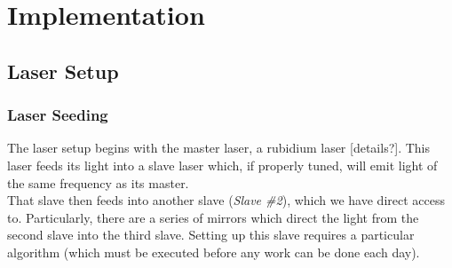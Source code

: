 \newpage
\section{Implementation}

\subsection{Laser Setup}

    \subsubsection{Laser Seeding}
    
The laser setup begins with the master laser, a rubidium laser [details?].  This laser feeds its light into a slave laser which, if properly tuned, will emit light of the same frequency as its master. \\

That slave then feeds into another slave (\emph{Slave \#2}), which we have direct access to.  Particularly, there are a series of mirrors which direct the light from the second slave into the third slave.  Setting up this slave requires a particular algorithm (which must be executed before any work can be done each day). \\

